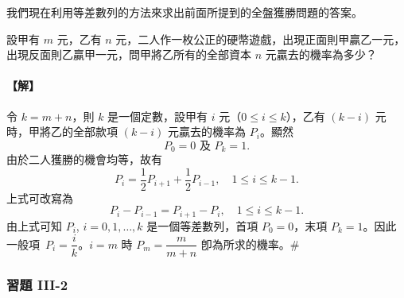 \vspace{0.8em}
我們現在利用等差數列的方法來求出前面所提到的全盤獲勝問題的答案。

\vspace{1em}
\begin{discussion}\label{disc:b5s-3-8}
設甲有 $m$ 元，乙有 $n$ 元，二人作一枚公正的硬幣遊戲，出現正面則甲贏乙一元，出現反面則乙贏甲一元，問甲將乙所有的全部資本 $n$ 元贏去的機率為多少？
\end{discussion}
\paragraph{【解】}
令 $k = m + n$，則 $k$ 是一個定數，設甲有 $i$ 元（$0 \le i \le k$），乙有 $(k - i)$ 元時，甲將乙的全部款項 $(k - i)$ 元贏去的機率為 $P_i$。顯然
\[
P_0 = 0 \text{ 及 } P_k = 1.
\]
由於二人獲勝的機會均等，故有
\[
P_i = \frac{1}{2} P_{i+1} + \frac{1}{2} P_{i-1}, \quad 1 \le i \le k - 1.
\]
上式可改寫為
\[
P_i - P_{i-1} = P_{i+1} - P_i, \quad 1 \le i \le k - 1.
\]
由上式可知 $P_i$, $i = 0, 1, \dots, k$ 是一個等差數列，首項 $P_0 = 0$，末項 $P_k = 1$。因此一般項~$P_i = \dfrac{i}{k}$。$i = m$ 時 $P_m = \dfrac{m}{m+n}$ 卽為所求的機率。\hfill\#

\vspace{1.5em}
\subsubsection*{習題 III-2}\label{sec:b5s-ex3-2}

